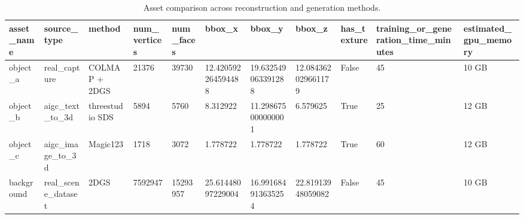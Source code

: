 \begin{table}[htbp]
\centering
\small
\begin{tabular}{lllllllllll}
\hline
asset\_name & source\_type & method & num\_vertices & num\_faces & bbox\_x & bbox\_y & bbox\_z & has\_texture & training\_or\_generation\_time\_minutes & estimated\_gpu\_memory \\
\hline
object\_a & real\_capture & COLMAP + 2DGS & 21376 & 39730 & 12.420592264594488 & 19.632549063391288 & 12.084362029661179 & False & 45 & 10 GB \\
object\_b & aigc\_text\_to\_3d & threestudio SDS & 5894 & 5760 & 8.312922 & 11.298675000000001 & 6.579625 & True & 25 & 12 GB \\
object\_c & aigc\_image\_to\_3d & Magic123 & 1718 & 3072 & 1.778722 & 1.778722 & 1.778722 & True & 60 & 12 GB \\
background & real\_scene\_dataset & 2DGS & 7592947 & 15293957 & 25.61448097229004 & 16.991684913635254 & 22.81913948059082 & False & 45 & 10 GB \\
\hline
\end{tabular}
\caption{Asset comparison across reconstruction and generation methods.}
\label{tab:asset\_comparison}
\end{table}
